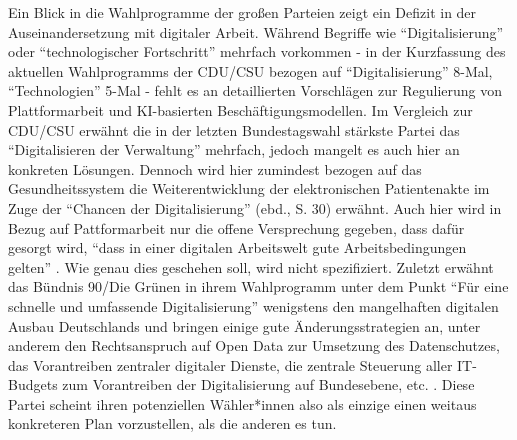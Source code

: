 \documentclass[12pt]{article}
\begin{document}
Ein Blick in die Wahlprogramme der großen Parteien zeigt ein Defizit in der Auseinandersetzung mit digitaler Arbeit. Während Begriffe wie \enquote{Digitalisierung} oder \enquote{technologischer Fortschritt} mehrfach vorkommen - in der Kurzfassung des aktuellen Wahlprogramms der CDU/CSU bezogen auf \enquote{Digitalisierung} 8-Mal, \enquote{Technologien} 5-Mal \autocite[vgl.][]{cducsu_kurzfassung_2025} - fehlt es an detaillierten Vorschlägen zur Regulierung von Plattformarbeit und KI-basierten Beschäftigungsmodellen. Im Vergleich zur CDU/CSU erwähnt die in der letzten Bundestagswahl stärkste Partei das \enquote{Digitalisieren der Verwaltung} \autocite[5]{spd_regierungsprogramm_2025} mehrfach, jedoch mangelt es auch hier an konkreten Lösungen. Dennoch wird hier zumindest bezogen auf das Gesundheitssystem die Weiterentwicklung der elektronischen Patientenakte im Zuge der \enquote{Chancen der Digitalisierung} (ebd., S. 30) erwähnt. Auch hier wird in Bezug auf Pattformarbeit nur die offene Versprechung gegeben, dass dafür gesorgt wird, \enquote{dass in einer digitalen Arbeitswelt gute Arbeitsbedingungen gelten} \autocite[13]{spd_regierungsprogramm_2025}. Wie genau dies geschehen soll, wird nicht spezifiziert. Zuletzt erwähnt das Bündnis 90/Die Grünen in ihrem Wahlprogramm unter dem Punkt \enquote{Für eine schnelle und umfassende Digitalisierung} wenigstens den mangelhaften digitalen Ausbau Deutschlands und bringen einige gute Änderungsstrategien an, unter anderem den Rechtsanspruch auf Open Data zur Umsetzung des Datenschutzes, das Vorantreiben zentraler digitaler Dienste, die zentrale Steuerung aller IT-Budgets zum Vorantreiben der Digitalisierung auf Bundesebene, etc. \autocite[vgl.][35]{bundnis_90die_grunen_zusammen_2025}. Diese Partei scheint ihren potenziellen Wähler*innen also als einzige einen weitaus konkreteren Plan vorzustellen, als die anderen es tun. 
\end{document}
